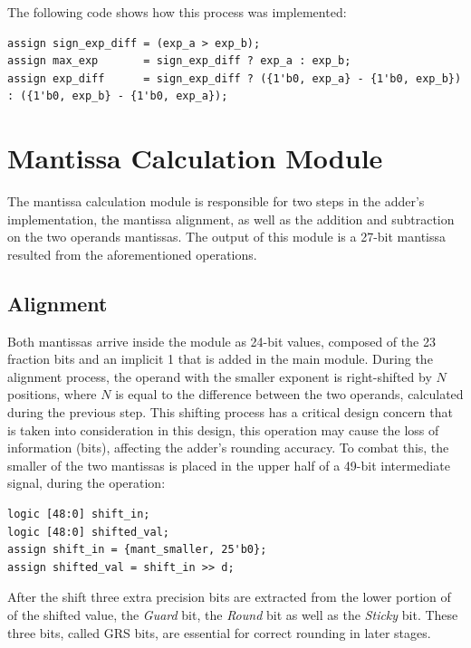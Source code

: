 \documentclass[12pt]{report}
\begin{document}
\newpage
\noindent The following code shows how this process was implemented:

\hspace{10pt}

\begin{lstlisting}[style=svstyle]
assign sign_exp_diff = (exp_a > exp_b);
assign max_exp       = sign_exp_diff ? exp_a : exp_b;
assign exp_diff      = sign_exp_diff ? ({1'b0, exp_a} - {1'b0, exp_b}) : ({1'b0, exp_b} - {1'b0, exp_a});
\end{lstlisting}

\section{Mantissa Calculation Module} \label{mantissa-calc-module}
The mantissa calculation module is responsible for two steps in the adder's implementation, the mantissa alignment, as well as the addition and subtraction on the two operands mantissas. The output of this module is a 27-bit mantissa resulted from the aforementioned operations.

\subsection{Alignment}
Both mantissas arrive inside the module as 24-bit values, composed of the 23 fraction bits and an implicit 1 that is added in the main module. During the alignment process, the operand with the smaller exponent is right-shifted by $N$ positions, where $N$ is equal to the difference between the two operands, calculated during the previous step. This shifting process has a critical design concern that is taken into consideration in this design, this operation may cause the loss of information (bits), affecting the adder's rounding accuracy. To combat this, the smaller of the two mantissas is placed in the upper half of a 49-bit intermediate signal, during the operation:

\hspace{10pt}

\begin{lstlisting}[style=svstyle]
logic [48:0] shift_in;
logic [48:0] shifted_val;
assign shift_in = {mant_smaller, 25'b0};
assign shifted_val = shift_in >> d;
\end{lstlisting}

\hspace{10pt}

\noindent After the shift three extra precision bits are extracted from the lower portion of of the shifted value, the \textit{Guard} bit, the \textit{Round} bit as well as the \textit{Sticky} bit. These three bits, called GRS bits, are essential for correct rounding in later stages. \\
\end{document}
